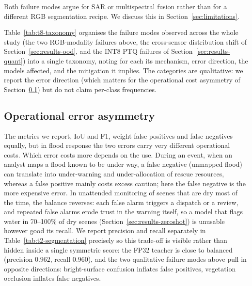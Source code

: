 Both failure modes argue for SAR or multispectral fusion rather than for a different RGB segmentation recipe. We discuss this in Section~\ref{sec:limitations}.

Table~\ref{tab:t8-taxonomy} organises the failure modes observed across the whole study (the two RGB-modality failures above, the cross-sensor distribution shift of Section~\ref{sec:results-ood}, and the INT8 PTQ failures of Section~\ref{sec:results-quant}) into a single taxonomy, noting for each its mechanism, error direction, the models affected, and the mitigation it implies. The categories are qualitative: we report the error direction (which matters for the operational cost asymmetry of Section~\ref{sec:discussion-asymmetry}) but do not claim per-class frequencies.



\subsection{Operational error asymmetry}
\label{sec:discussion-asymmetry}

The metrics we report, IoU and F1, weight false positives and false negatives equally, but in flood response the two errors carry very different operational costs. Which error costs more depends on the use. During an event, when an analyst maps a flood known to be under way, a false negative (unmapped flood) can translate into under-warning and under-allocation of rescue resources, whereas a false positive mainly costs excess caution; here the false negative is the more expensive error. In unattended monitoring of scenes that are dry most of the time, the balance reverses: each false alarm triggers a dispatch or a review, and repeated false alarms erode trust in the warning itself, so a model that flags water in 70--100\% of dry scenes (Section~\ref{sec:results-zeroshot}) is unusable however good its recall. We report precision and recall separately in Table~\ref{tab:t2-segmentation} precisely so this trade-off is visible rather than hidden inside a single symmetric score: the FP32 teacher is close to balanced (precision $0.962$, recall $0.960$), and the two qualitative failure modes above pull in opposite directions: bright-surface confusion inflates false positives, vegetation occlusion inflates false negatives.

